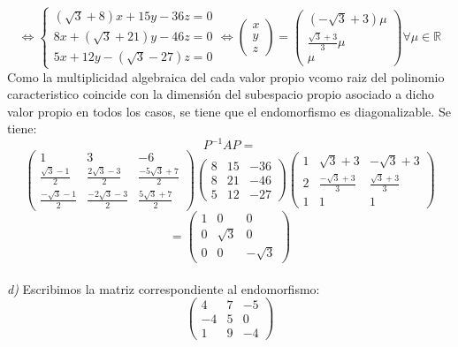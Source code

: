 \documentclass{article}
\begin{document}
$$
\Leftrightarrow \left\{ \begin{array}{c}
     (\sqrt{3}+8)x+15y-36z =0  \\
     8x+(\sqrt{3}+21)y-46z =0  \\
     5x+12y-(\sqrt{3}-27)z =0
\end{array} \right.
\Leftrightarrow \left( \begin{array}{c}
      x \\
      y \\
      z
\end{array} \right) =
\left( \begin{array}{c}
      (-\sqrt{3}+3)\mu \\
      \frac{\sqrt{3}+3}{3}\mu \\
      \mu
\end{array} \right) \forall \mu \in \mathbb{R}
$$
Como la multiplicidad algebraica del cada valor propio vcomo raiz del polinomio caracteristico coincide con la dimensión del subespacio propio asociado a dicho valor propio en todos los casos, se tiene que el endomorfismo es diagonalizable. Se tiene:
$$
P^{-1}AP =
$$
$$
\left( \begin{array}{ccc}
    1 & 3 & -6\\
    \frac{\sqrt{3}-1}{2} & \frac{2\sqrt{3}-3}{2} & \frac{-5\sqrt{3}+7}{2}\\
    \frac{-\sqrt{3}-1}{2} & \frac{-2\sqrt{3}-3}{2} & \frac{5\sqrt{3}+7}{2}
\end{array} \right)
\left( \begin{array}{ccc}
    8 & 15 & -36\\
    8 & 21 & -46\\
    5 & 12 & -27
\end{array} \right)
\left( \begin{array}{ccc}
    1 & \sqrt{3}+3 & -\sqrt{3}+3\\
    2 & \frac{-\sqrt{3}+3}{3} & \frac{\sqrt{3}+3}{3}\\
    1 & 1 & 1
\end{array} \right)
$$
$$
=
\left( \begin{array}{ccc}
    1 & 0 & 0\\
    0 & \sqrt{3} & 0\\
    0 & 0 & -\sqrt{3}
\end{array} \right)
$$\\
%
%
%
%
\textit{d)}
Escribimos la matriz correspondiente al endomorfismo:\\
$$
\left( \begin{array}{ccc}
    4 & 7 & -5\\
    -4 & 5 & 0\\
    1 & 9 & -4
\end{array} \right)
$$
\end{document}
